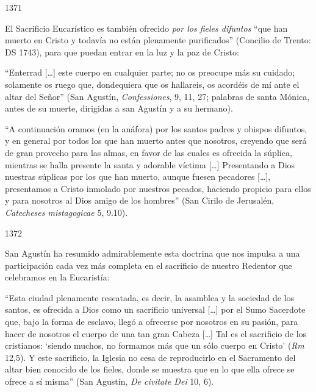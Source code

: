 			\begin{ccebody}\begin{ccenumber}1371\end{ccenumber} El Sacrificio Eucarístico es también ofrecido \textit{por los fieles difuntos} “que han muerto en Cristo y todavía no están plenamente purificados” (Concilio de Trento: DS 1743), para que puedan entrar en la luz y la paz de Cristo:\end{ccebody}
			
			\begin{ccecite}“Enterrad […] este cuerpo en cualquier parte; no os preocupe más su cuidado; solamente os ruego que, dondequiera que os hallareis, os acordéis de mí ante el altar del Señor” (San Agustín, \textit{Confessiones}, 9, 11, 27; palabras de santa Mónica, antes de su muerte, dirigidas a san Agustín y a su hermano).\end{ccecite}
			
			\begin{ccecite}“A continuación oramos (en la anáfora) por los santos padres y obispos difuntos, y en general por todos los que han muerto antes que nosotros, creyendo que será de gran provecho para las almas, en favor de las cuales es ofrecida la súplica, mientras se halla presente la santa y adorable víctima […] Presentando a Dios nuestras súplicas por los que han muerto, aunque fuesen pecadores […], presentamos a Cristo inmolado por nuestros pecados, haciendo propicio para ellos y para nosotros al Dios amigo de los hombres” (San Cirilo de Jerusalén, \textit{Catecheses mistagogicae} 5, 9.10).\end{ccecite}
			
			\begin{ccebody}\begin{ccenumber}1372\end{ccenumber} San Agustín ha resumido admirablemente esta doctrina que nos impulsa a una participación cada vez más completa en el sacrificio de nuestro Redentor que celebramos en la Eucaristía:\end{ccebody}
			
			\begin{ccecite}“Esta ciudad plenamente rescatada, es decir, la asamblea y la sociedad de los santos, es ofrecida a Dios como un sacrificio universal […] por el Sumo Sacerdote que, bajo la forma de esclavo, llegó a ofrecerse por nosotros en su pasión, para hacer de nosotros el cuerpo de una tan gran Cabeza […] Tal es el sacrificio de los cristianos: ‘siendo muchos, no formamos más que un sólo cuerpo en Cristo’ (\textit{Rm} 12,5). Y este sacrificio, la Iglesia no cesa de reproducirlo en el Sacramento del altar bien conocido de los fieles, donde se muestra que en lo que ella ofrece se ofrece a sí misma” (San Agustín, \textit{De civitate Dei} 10, 6).\end{ccecite}
			
